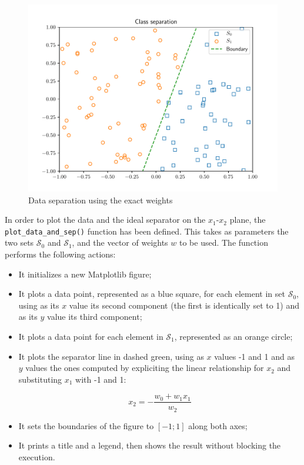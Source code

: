 \documentclass[letterpaper,headings=standardclasses]{scrartcl}
\begin{document}
\begin{figure}[h]
\centering
\includegraphics[width=.7\linewidth]{exact_sep.pdf}
\caption{Data separation using the exact weights}
\label{exact_sep}
\end{figure}

In order to plot the data and the ideal separator on the $x_1$-$x_2$ plane, the \texttt{plot\_data\_and\_sep()} function has been defined. This takes as parameters the two sets $\mathcal{S}_0$ and $\mathcal{S}_1$, and the vector of weights $w$ to be used. The function performs the following actions:

\begin{itemize}

\item It initializes a new Matplotlib figure;

\item It plots a data point, represented as a blue square, for each element in set $\mathcal{S}_0$, using as its $x$ value its second component (the first is identically set to 1) and as its $y$ value its third component;

\item It plots a data point for each element in $\mathcal{S}_1$, represented as an orange circle;

\item It plots the separator line in dashed green, using as $x$ values -1 and 1 and as $y$ values the ones computed by expliciting the linear relationship for $x_2$ and substituting $x_1$ with -1 and 1:

$$ x_2 = -\frac{w_0 + w_1 x_1}{w_2} $$

\item It sets the boundaries of the figure to $[-1;1]$ along both axes;

\item It prints a title and a legend, then shows the result without blocking the execution.

\end{itemize}
\end{document}
